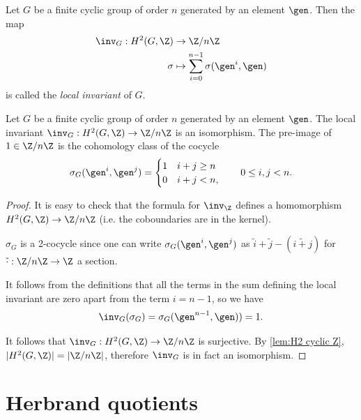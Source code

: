 \begin{definition} \label{def:local inv}
	\leanok

	Let $G$ be a finite cyclic group of order $n$ generated by an element $\gen$.
	Then the map
	\begin{align*}
		\inv_G : H^2(G,\Z) & \to \Z/n\Z \\
		\sigma & \mapsto \sum_{i=0}^{n-1} \sigma(\gen^i,\gen)
	\end{align*}
	is called the \emph{local invariant} of $G$.
\end{definition}


\begin{lemma} \label{lem:local inv iso}
	\leanok

	Let $G$ be a finite cyclic group of order $n$ generated by an element $\gen$.
	The local invariant $\inv_G : H^2(G,\Z) \to \Z/n\Z$ is an isomorphism.
	The pre-image of $1 \in \Z/n\Z$ is the cohomology class of the cocycle
	\[
		\sigma_G (\gen^i, \gen^j) = \begin{cases}
			1 & i+j \ge n \\
			0 & i+j < n,
		\end{cases}
		\qquad 0 \le i,j < n.
	\]
\end{lemma}

\begin{proof}
	\leanok

	It is easy to check that the formula for $\inv_\Z$ defines a homomorphism
	$H^2(G,\Z) \to \Z / n \Z$ (i.e. the coboundaries are in the kernel).

	$\sigma_G$ is a 2-cocycle since one can write $\sigma_G(\gen^i, \gen^j)$ as
	$\tilde i + \tilde j - (\widetilde{i + j})$ for $\tilde\cdot : \Z/n\Z \to \Z$ a section.

	It follows from the definitions that all the terms in the sum defining the local invariant are
	zero apart from the term $i=n-1$, so we have
	\[
		\inv_G(\sigma_G)
		= \sigma_G(\gen^{n-1}, \gen))
		= 1.
	\]

	It follows that $\inv_G : H^2(G,\Z) \to \Z/n\Z$ is surjective.
	By \ref{lem:H2 cyclic Z}, $|H^2(G,\Z)| = |\Z/n\Z|$, therefore $\inv_G$ is in fact an isomorphism.
\end{proof}





\section{Herbrand quotients}

